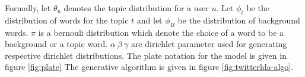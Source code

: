 Formally, let $\theta_u$ denotes the topic distribution for a user $u$. Let $\phi_t$ be the distribution of words for the topic $t$ and let $\phi_B$ be the distribution of background words. $\pi$ is a bernouli distribution which denote the choice of a word to be a background or a topic word. $\alpha~\beta~\gamma$ are dirichlet parameter used for generating respective dirichlet distributions. The plate notation for the model is given in figure \ref{fig:plate} The generative algorithm is given in figure \ref{fig:twitterlda-algo}.